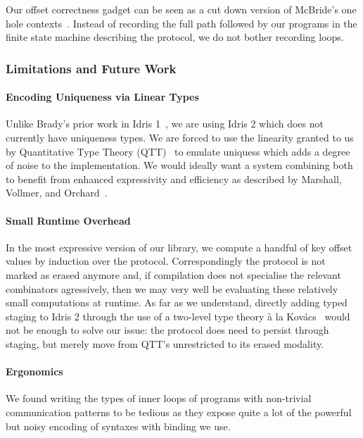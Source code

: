 \documentclass{easychair}
\begin{document}
Our offset correctness gadget can be seen as a cut down version of
McBride's one hole contexts~\cite{DBLP:conf/popl/McBride08}. Instead
of recording the full path followed by our programs in the finite
state machine describing the protocol, we do not bother recording
loops.

\subsubsection*{Limitations and Future Work}

\paragraph{Encoding Uniqueness via Linear Types}
Unlike Brady's prior work in Idris 1~\cite{DBLP:journals/aghcs/Brady17},
we are using Idris 2 which does not currently have uniqueness types.
We are forced to use the linearity granted to us by
Quantitative Type Theory (QTT)~\cite{DBLP:conf/birthday/McBride16,DBLP:conf/lics/Atkey18}
to emulate uniquess which adds a degree of noise to the implementation.
We would ideally want a system combining both to benefit from enhanced
expressivity and efficiency as described by Marshall, Vollmer,
and Orchard~\cite{DBLP:conf/esop/MarshallVO22}.

\paragraph{Small Runtime Overhead}
In the most expressive version of our library, we compute a handful
of key offset values by induction over the protocol. Correspondingly
the protocol is not marked as erased anymore and, if compilation does
not specialise the relevant combinators agressively, then we may very
well be evaluating these relatively small computations at runtime.
%
As far as we understand, directly adding typed staging to Idris 2
through the use of a two-level type theory à la
Kov{\'{a}}cs~\cite{DBLP:journals/pacmpl/Kovacs22} would not be
enough to solve our issue: the protocol does need to persist
through staging, but merely move from QTT's unrestricted to its
erased modality.

\paragraph{Ergonomics}
We found writing the types of inner loops of programs with non-trivial
communication patterns to be tedious as they expose quite a lot of the
powerful but noisy encoding of syntaxes with binding we use.






%
%
%

\end{document}
